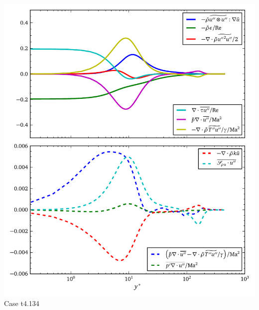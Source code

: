 \documentclass[mathserif]{beamer}
\begin{document}
\begin{frame}
\begin{columns}
\begin{column}{0.5\linewidth}
          \includegraphics[width=\textwidth]{hqd_tke_t4134}
          \\\vspace{-0.5em}
          Case t4.134
        \end{column}
    \end{columns}
\end{frame}
\end{document}
